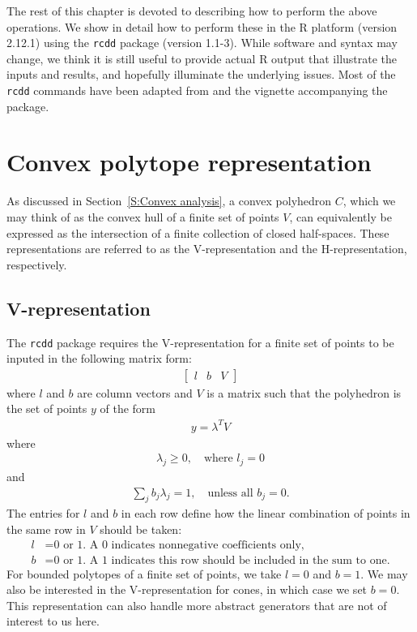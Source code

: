 The rest of this chapter is devoted to describing how to perform the above
operations.  We show in detail how to perform these in the R platform (version 2.12.1)
using the \texttt{rcdd} package (version 1.1-3).  While software and syntax may change,
we think it is still useful to provide actual R output that illustrate the
inputs and results, and hopefully illuminate the underlying issues.  Most of the  
\texttt{rcdd} commands have been adapted from \citet{Geyer:2009} and the vignette accompanying the package.

\section{Convex polytope representation}
As discussed in Section~\ref{S:Convex analysis}, a convex polyhedron $C$, which we 
may think of as the convex hull of a finite set of points $V$, can equivalently
be expressed as the intersection of a finite collection of closed half-spaces.  These
representations are referred to as the V-representation and the H-representation, 
respectively.

\subsection{V-representation} \label{S:V-rep}
The \texttt{rcdd} package requires the V-representation for a finite set of points 
to be inputed in the following matrix form:
\begin{align} \label{E:V-rep}
	\left[\begin{array}{ccc}l & b & V\end{array}\right]
\end{align}
where $l$ and $b$ are column vectors and $V$ is a matrix such that the polyhedron
is the set of points $y$ of the form
\begin{align*}
	y = \lambda^T V
\end{align*}
where
\begin{align*}
	\lambda_j \geq 0, \quad \text{where $l_j = 0$}
\end{align*}
and 
\begin{align*}
	\sum_j b_j \lambda_j = 1, \quad \text{unless all $b_j = 0$.}
\end{align*}
The entries for $l$ and $b$ in each row define how the linear combination of 
points in the same row in $V$ should be taken:
\begin{align*}
	l &= \text{0 or 1.  A 0 indicates nonnegative coefficients only,}\\
	b &= \text{0 or 1.  A 1 indicates this row should be included in the sum to one.}
\end{align*}
For bounded polytopes of a finite set of points, we take $l = 0$ and $b = 1$.  
We may also be interested in the V-representation for cones, in 
which case we set $b=0$.  
This representation can also handle more abstract generators that 
are not of interest to us here.

